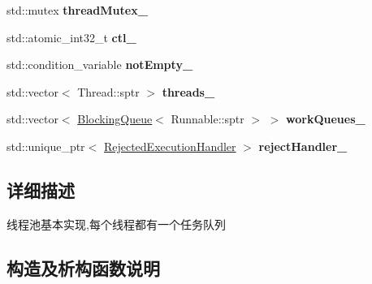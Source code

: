 \begin{DoxyCompactItemize}
\mbox{\label{classThreadPoolExecutor_af4f94013afa2ddf003b2f8ff7f7a8fad}} 
std\+::mutex {\bfseries thread\+Mutex\+\_\+}
\item 
\mbox{\label{classThreadPoolExecutor_a010113b7aac17ef364d417c485263873}} 
std\+::atomic\+\_\+int32\+\_\+t {\bfseries ctl\+\_\+}
\item 
\mbox{\label{classThreadPoolExecutor_ad523af8548ca8f1dae80cb295ee567b3}} 
std\+::condition\+\_\+variable {\bfseries not\+Empty\+\_\+}
\item 
\mbox{\label{classThreadPoolExecutor_a47dd74330fa41d01067943b1db74818a}} 
std\+::vector$<$ Thread\+::sptr $>$ {\bfseries threads\+\_\+}
\item 
\mbox{\label{classThreadPoolExecutor_a415491f8f40c0fcb99e7ec25cdd209d0}} 
std\+::vector$<$ \hyperlink{classBlockingQueue}{Blocking\+Queue}$<$ Runnable\+::sptr $>$ $>$ {\bfseries work\+Queues\+\_\+}
\item 
\mbox{\label{classThreadPoolExecutor_a347041db412b03aa09dd4e9b3beaa391}} 
std\+::unique\+\_\+ptr$<$ \hyperlink{classRejectedExecutionHandler}{Rejected\+Execution\+Handler} $>$ {\bfseries reject\+Handler\+\_\+}
\end{DoxyCompactItemize}


\subsection{详细描述}
线程池基本实现,每个线程都有一个任务队列 

\subsection{构造及析构函数说明}
\mbox{\label{classThreadPoolExecutor_a212b34b7e25e9eba4e096473a1b81f9e}} 
